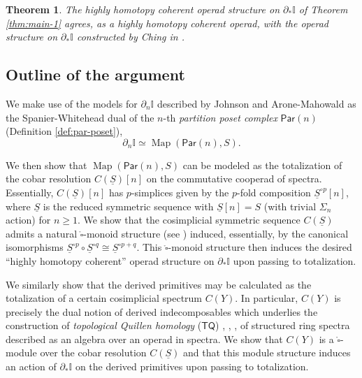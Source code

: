 \documentclass[12pt]{amsart}
\newtheorem{theorem}[subsection]{Theorem}
\theoremstyle{definition}
\theoremstyle{remark}
\newcommand{\TQ}{\mathsf{TQ}}
\newcommand{\Map}{\operatorname{Map}}
\newcommand{\Id}{\mathbb{I}}
\newcommand{\boxcirc}{\mathring{\square}}
\newcommand{\uS}{\underline{S}}
\newcommand{\Par}{\mathsf{Par}}
\begin{document}
\begin{theorem} \label{thm:main-3}
    The highly homotopy coherent operad structure on $\partial_* \Id$ of Theorem \ref{thm:main-1} agrees, as a highly homotopy coherent operad, with the operad structure on $\partial_* \Id$ constructed by Ching in \cite{Ching-thesis}.
\end{theorem}

\subsection{Outline of the argument} \label{sec:outline-comparison}
We make use of the models for $\partial_n \Id$ described by Johnson \cite{Joh} and Arone-Mahowald \cite{Ar-Mah} as the Spanier-Whitehead dual of the $n$-th \textit{partition poset complex} $\Par(n)$ (Definition \ref{def:par-poset}), \[ \partial_n \Id \simeq \Map(\Par(n),S).\]

We then show that $\Map(\Par(n),S)$ can be modeled as the totalization of the cobar resolution $C(\uS)[n]$ on the commutative cooperad of spectra. Essentially, $C(\uS)[n]$ has $p$-simplices given by the $p$-fold composition $\uS^{\circ p}[n]$, where $\uS$ is the reduced symmetric sequence with $\uS[n]=S$ (with trivial $\Sigma_n$ action) for $n\geq 1$. We show that the cosimplicial symmetric sequence $C(\uS)$ admits a natural $\boxcirc$-monoid structure (see \cite[Definition 5.6]{Clark-1}) induced, essentially, by the canonical isomorphisms $\uS^{\circ p} \circ \uS^{\circ q} \cong \uS^{\circ p+q}$. This $\boxcirc$-monoid structure then induces the desired ``highly homotopy coherent'' operad structure on $\partial_* \Id$ upon passing to totalization.

We similarly show that the derived primitives may be calculated as the totalization of a certain cosimplicial spectrum $C(Y)$. In particular, $C(Y)$ is precisely the dual notion of derived indecomposables which underlies the construction of \textit{topological Quillen homology} ($\TQ$) \cite{Bast}, \cite{Bast-Man}, \cite{Kuh}, \cite{Har-TQ} of structured ring spectra described as an algebra over an operad in spectra. We show that $C(Y)$ is a $\boxcirc$-module over the cobar resolution $C(\uS)$ and that this module structure induces an action of $\partial_*\Id$ on the derived primitives upon passing to totalization.
\end{document}
